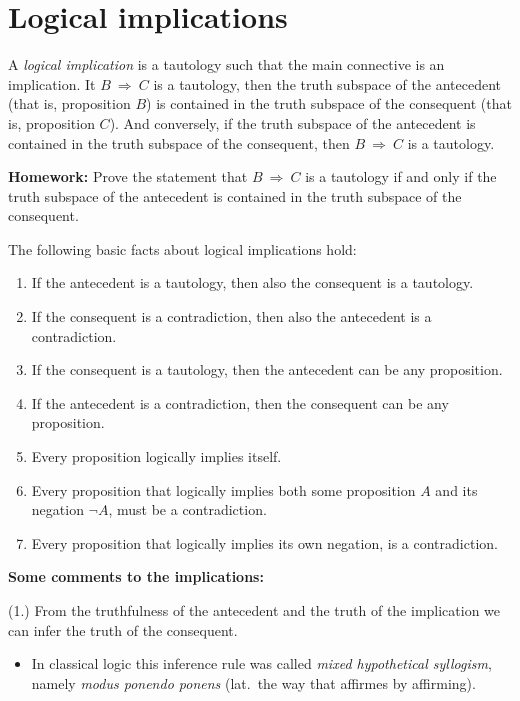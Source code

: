 \documentclass[11pt,paper=b5,footinclude,headinclude]{scrbook} %
\def\sledi {{~\Rightarrow~}}
\theoremstyle{remark}
\theoremstyle{definition} %
\theoremstyle{theorem} %
\begin{document}
\section{Logical implications}

A {\em logical implication} is a tautology such that the main connective is an implication.
It $B\sledi C$ is a tautology, then the truth subspace of the antecedent (that is, proposition $B$) is
 contained in the truth subspace of the consequent (that is, proposition $C$). And conversely,
 if the truth subspace of the antecedent is contained in the truth subspace of the consequent, then
$B\sledi C$ is a tautology.

\textbf{ Homework:} Prove the statement that $B\sledi C$ is a tautology if and only if
the truth subspace of the antecedent is contained in the truth subspace of the consequent.

\bigskip
The following basic facts about logical implications hold:
\begin{enumerate}
  \item If the antecedent is a tautology, then also the consequent is a
  tautology.
  \item If the consequent is a contradiction, then also the antecedent is a contradiction.
  \item If the consequent is a tautology, then the antecedent can be any proposition.
  \item If the antecedent is a contradiction, then the consequent can be any proposition.
  \item Every proposition logically implies itself.
  \item Every proposition that logically implies both some proposition $A$ and its negation $\neg A$, must be a contradiction.
  \item Every proposition that logically implies its own negation, is a contradiction.
\end{enumerate}


\textbf{ Some comments to the implications:}

(1.) From the truthfulness of the antecedent and the truth of the implication we can infer the truth of the consequent.
\begin{itemize}
  \item In classical logic this inference rule was called {\em mixed hypothetical syllogism}, namely {\em modus ponendo ponens} (lat.~the way that affirmes by affirming).
\end{itemize}
\end{document}
